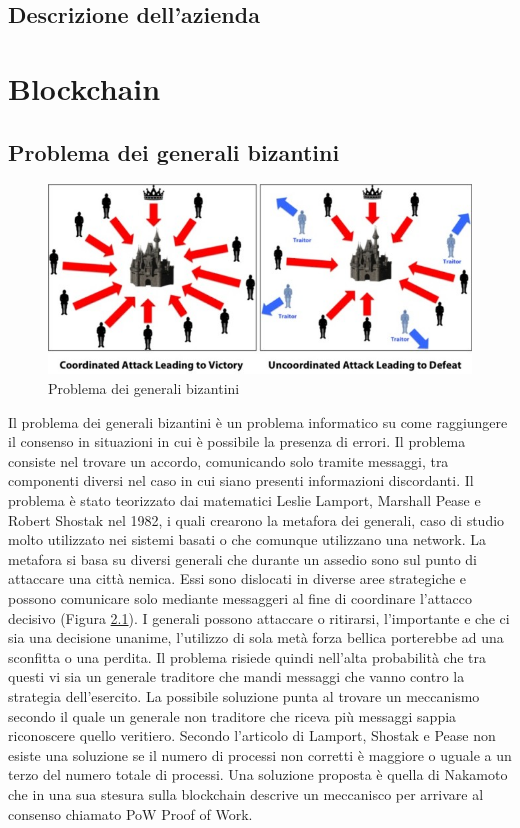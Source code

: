 \documentclass[11pt,a4paper,titlepage]{report}
\begin{document}
\section{Descrizione dell’azienda}

\chapter{Blockchain}
\section{Problema dei generali bizantini}
\begin{figure}[h]
	\includegraphics[width=\textwidth]{BF}
	\centering
	\caption{Problema dei generali bizantini}
	\label{fig:ByzantinFault}
\end{figure}

Il problema dei generali bizantini è un problema informatico su come raggiungere il consenso in situazioni in cui è possibile la presenza di errori. Il problema consiste nel trovare un accordo, comunicando solo tramite messaggi, tra componenti diversi nel caso in cui siano presenti informazioni discordanti. Il problema è stato teorizzato dai matematici Leslie Lamport, Marshall Pease e Robert Shostak nel 1982, i quali crearono la metafora dei generali, caso di studio molto utilizzato nei sistemi basati o che comunque utilizzano una network. La metafora si basa su diversi generali che durante un assedio sono sul punto di attaccare una città nemica. Essi sono dislocati in diverse aree strategiche e possono comunicare solo mediante messaggeri al fine di coordinare l'attacco decisivo (Figura \ref{fig:ByzantinFault}). I generali possono attaccare o ritirarsi, l'importante e che ci sia una decisione unanime, l'utilizzo di sola metà forza bellica porterebbe ad una sconfitta o una perdita. Il problema risiede quindi nell'alta probabilità che tra questi vi sia un generale traditore che mandi messaggi che vanno contro la strategia dell'esercito. La possibile soluzione punta al trovare un meccanismo secondo il quale un generale non traditore che riceva più messaggi sappia riconoscere quello veritiero. Secondo l'articolo di Lamport, Shostak e Pease non esiste una soluzione se il numero di processi non corretti è maggiore o uguale a un terzo del numero totale di processi. Una soluzione proposta è quella di Nakamoto che in una sua stesura sulla blockchain descrive un meccanisco per arrivare al consenso chiamato PoW Proof of Work.
\end{document}
